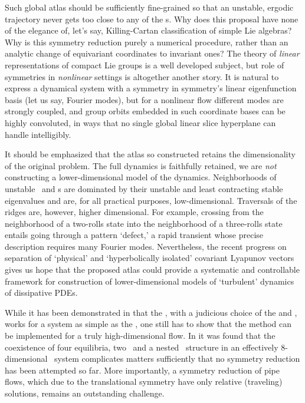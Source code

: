 Such global atlas should be sufficiently fine-grained so that an unstable,
ergodic trajectory never gets too close to any of the {\sset s}.
Why does this proposal have none of the elegance of, let's say,
Killing-Cartan classification of simple Lie algebras?
Why is this symmetry reduction purely a numerical procedure, rather
than an analytic change of equivariant coordinates to invariant ones?
The theory of \emph{linear} representations of compact Lie groups is a well
developed subject,
but role of symmetries in \emph{nonlinear} settings is
altogether another story. It is natural to express a dynamical system
with a symmetry in symmetry's linear eigenfunction basis (let  us say,
Fourier modes), but for a nonlinear flow different modes are strongly coupled,
and group orbits embedded in such coordinate bases can be highly convoluted,
in ways that no single global linear slice hyperplane can handle intelligibly.

It should be emphasized that the atlas so constructed retains the dimensionality of
the original problem. The full dynamics is faithfully retained, we are \emph{not}
constructing a lower-dimensional model of the dynamics. Neighborhoods of
unstable \eqva\ and \po s are dominated by their unstable and least
contracting stable eigenvalues and are, for all practical purposes,
low-dimensional. Traversals of the ridges are, however, higher
dimensional. For example, crossing from the neighborhood of a two-rolls
state into the neighborhood of a three-rolls state entails going through
a pattern `defect,' a rapid transient whose precise description requires
many Fourier modes. Nevertheless,
the recent progress on separation of `physical' and `hyperbolically
isolated' covariant Lyapunov
vectors gives us
hope that the proposed atlas could provide a systematic and controllable
framework for construction of lower-dimensional models of `turbulent'
dynamics of dissipative PDEs.

While it has been demonstrated in   that the \mslices,
with a judicious choice of the {\template} and {\PoincSec}, works for a
system as simple as the \cLf, one still has to show that the method can
be implemented for a truly high-dimensional flow. In  it
was found that the coexistence of four equilibria, two \reqva\ and a
nested \fixedsp\ structure in an effectively $8$-dimensional \KS\ system
complicates matters sufficiently that no symmetry reduction has been
attempted so far. More importantly, a symmetry reduction of pipe flows, which
due to the translational symmetry have only relative (traveling)
solutions, remains an outstanding challenge.
